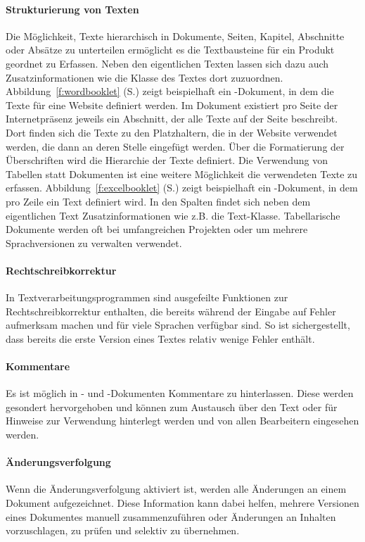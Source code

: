 \paragraph{Strukturierung von Texten} Die Möglichkeit, Texte hierarchisch in Dokumente, Seiten, Kapitel, Abschnitte oder Absätze zu unterteilen ermöglicht es die Textbausteine für ein Produkt geordnet zu Erfassen. Neben den eigentlichen Texten lassen sich dazu auch Zusatzinformationen wie die Klasse des Textes dort zuzuordnen. Abbildung~\ref{f:wordbooklet} (S.\pageref{f:wordbooklet}) zeigt beispielhaft ein -Dokument, in dem die Texte für eine Website definiert werden. Im Dokument existiert pro Seite der Internetpräsenz jeweils ein Abschnitt, der alle Texte auf der Seite beschreibt. Dort finden sich die Texte zu den Platzhaltern, die in der Website verwendet werden, die dann an deren Stelle eingefügt werden. Über die Formatierung der Überschriften wird die Hierarchie der Texte definiert. Die Verwendung von Tabellen statt Dokumenten ist eine weitere Möglichkeit die verwendeten Texte zu erfassen. Abbildung~\ref{f:excelbooklet} (S.\pageref{f:excelbooklet}) zeigt beispielhaft ein -Dokument, in dem pro Zeile ein Text definiert wird. In den Spalten findet sich neben dem eigentlichen Text Zusatzinformationen wie z.B. die Text-Klasse. Tabellarische Dokumente werden oft bei umfangreichen Projekten oder um mehrere Sprachversionen zu verwalten verwendet.

\paragraph{Rechtschreibkorrektur} In Textverarbeitungsprogrammen sind ausgefeilte Funktionen zur Rechtschreibkorrektur enthalten, die bereits während der Eingabe auf Fehler aufmerksam machen und für viele Sprachen verfügbar sind. So ist sichergestellt, dass bereits die erste Version eines Textes relativ wenige Fehler enthält.

\paragraph{Kommentare} Es ist möglich in - und -Dokumenten Kommentare zu hinterlassen. Diese werden gesondert hervorgehoben und können zum Austausch über den Text oder für Hinweise zur Verwendung hinterlegt werden und von allen Bearbeitern eingesehen werden.

\paragraph{Änderungsverfolgung} Wenn die Änderungsverfolgung aktiviert ist, werden alle Änderungen an einem Dokument aufgezeichnet. Diese Information kann dabei helfen, mehrere Versionen eines Dokumentes manuell zusammenzuführen oder Änderungen an Inhalten vorzuschlagen, zu prüfen und selektiv zu übernehmen.

